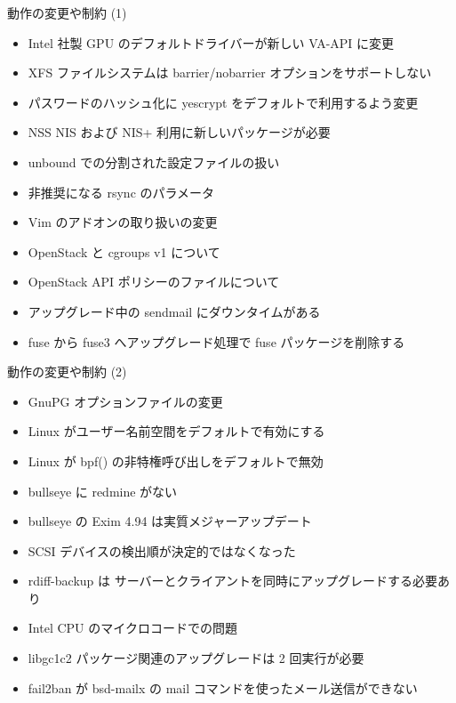 \begin{frame}{動作の変更や制約 (1)}%

\begin{itemize}
\item Intel 社製 GPU のデフォルトドライバーが新しい VA-API に変更
\item XFS ファイルシステムは barrier/nobarrier オプションをサポートしない
\item パスワードのハッシュ化に yescrypt をデフォルトで利用するよう変更
\item NSS NIS および NIS+ 利用に新しいパッケージが必要
\item unbound での分割された設定ファイルの扱い
\item 非推奨になる rsync のパラメータ
\item Vim のアドオンの取り扱いの変更
\item OpenStack と cgroups v1 について
\item OpenStack API ポリシーのファイルについて
\item アップグレード中の sendmail にダウンタイムがある
\item fuse から fuse3 へアップグレード処理で fuse パッケージを削除する
\end{itemize}

\end{frame}


\begin{frame}{動作の変更や制約 (2)}%

\begin{itemize}
\item GnuPG オプションファイルの変更
\item Linux がユーザー名前空間をデフォルトで有効にする
\item Linux が bpf() の非特権呼び出しをデフォルトで無効
\item bullseye に redmine がない
\item bullseye の Exim 4.94 は実質メジャーアップデート
\item SCSI デバイスの検出順が決定的ではなくなった
\item rdiff-backup は サーバーとクライアントを同時にアップグレードする必要あり
\item Intel CPU のマイクロコードでの問題
\item libgc1c2 パッケージ関連のアップグレードは 2 回実行が必要
\item fail2ban が bsd-mailx の mail コマンドを使ったメール送信ができない
\end{itemize}

\end{frame}


